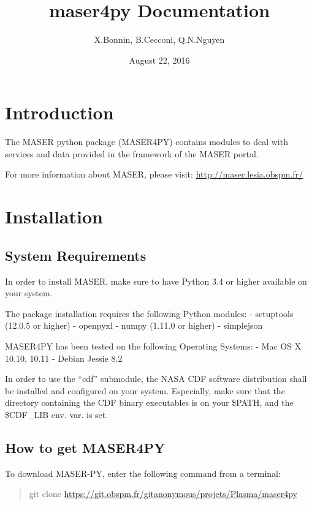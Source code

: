 \documentclass[letterpaper,10pt,english]{sphinxmanual}
\title{maser4py Documentation}
\date{August 22, 2016}
\author{X.Bonnin, B.Cecconi, Q.N.Nguyen}
\begin{document}
\maketitle
\tableofcontents
{}\label{index::doc}



\chapter{Introduction}
\label{intro:welcome-to-maser4py-s-documentation}\label{intro::doc}\label{intro:introduction}
The MASER python package (MASER4PY) contains modules to
deal with services and data provided in the framework
of the MASER portal.

For more information about MASER, please visit: \href{http://maser.lesia.obspm.fr/}{http://maser.lesia.obspm.fr/}


\chapter{Installation}
\label{intro:installation}

\section{System Requirements}
\label{intro:system-requirements}
In order to install MASER, make sure to have Python 3.4 or higher
available on your system.

The package installation requires the following Python modules:
- setuptools (12.0.5 or higher)
- openpyxl
- numpy (1.11.0 or higher)
- simplejson

MASER4PY has been tested on the following Operating Systems:
- Mac OS X 10.10, 10.11
- Debian Jessie 8.2

In order to use the ``cdf'' submodule, the NASA CDF software
distribution shall be installed and configured on your system.
Especially, make sure that the directory containing the CDF binary
executables is on your \$PATH, and the \$CDF\_LIB env. var. is set.


\section{How to get MASER4PY}
\label{intro:how-to-get-maser4py}
To download MASER-PY, enter the following command from a terminal:
\begin{quote}

git clone \href{https://git.obspm.fr/gitanonymous/projets/Plasma/maser4py}{https://git.obspm.fr/gitanonymous/projets/Plasma/maser4py}
\end{quote}
\end{document}
